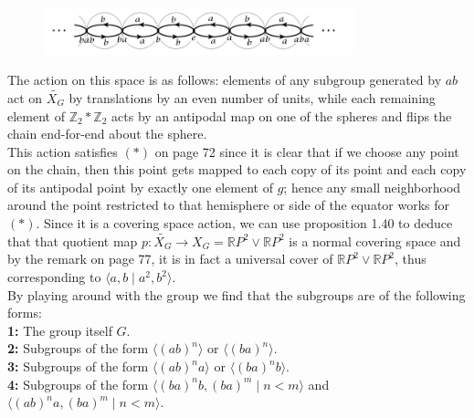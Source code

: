 \documentclass[a4paper]{article}
\begin{document}
\begin{figure}[htpb]
    \centering
    \includegraphics[width=0.8\textwidth]{orbit-space.png}
    \label{fig:orbit-space-png}
\end{figure}

The action on this space is as follows: elements of any subgroup generated by $ab$
act on $\tilde{X_G}$ by
translations by an even number of units, while each remaining element of
$\mathbb{Z}_2 * \mathbb{Z}_2$ acts by an antipodal map on one of the spheres
and flips the chain end-for-end about the sphere.\\
This action satisfies $(*)$ on page 72 since it is clear that if we choose any
point on the chain, then this point gets mapped to each copy of its point and
each copy of its antipodal point by exactly one element of $g$; hence any small
neighborhood around the point restricted to that hemisphere or side of the
equator works for $(*)$. Since it is a covering space action, we can use
proposition 1.40 to deduce that that quotient map
$p : \tilde{X_G} \to X_G = \mathbb{R}P^2 \vee \mathbb{R}P^2$ is a normal
covering space and by the remark on page 77, it is in fact a universal cover of
$\mathbb{R}P^2 \vee \mathbb{R}P^2$, thus corresponding to 
$\langle a,b  \mid a^2, b^2 \rangle$.\\
\linebreak
By playing around with the group we find that the subgroups are of the
following forms:\\
\textbf{1:} The group itself $G$.\\
\linebreak
\textbf{2:} Subgroups of the form
$\langle (ab)^{n} \rangle$ or $\langle (ba)^{n} \rangle$.\\
\linebreak
\textbf{3:} Subgroups of the form
$\langle (ab)^{n}a \rangle$ or $\langle  (ba)^{n} b \rangle$.\\
\linebreak
\textbf{4:} Subgroups of the form
$\langle (ba)^{n} b, (ba)^{m}  \mid n < m \rangle $ and 
$\langle  (ab)^{n} a, (ba)^{m}  \mid n < m \rangle$.\\
\linebreak
\end{document}
